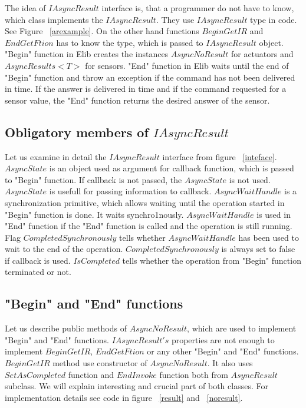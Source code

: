 	
	The idea of $IAsyncResult$ interface is, that a programmer do not have to know, which
	class implements the $IAsyncResult$. They use $IAsyncResult$ type in code. See Figure ~\ref{arexample}. 
	On the other hand functions $BeginGetIR$ and $EndGetFtion$ has to know the type, which is passed to $IAsyncResult$ object.
	"Begin" function in Elib creates the instances $AsyncNoResult$ for actuators and $AsyncResults<T>$ for sensors.
	"End" function in Elib waits until the end of "Begin" function and throw an exception if the command has not been delivered in time.
	If the answer is delivered in time and if the command requested for a sensor value, the "End" function returns the desired answer of the sensor.
	
\subsection*{Obligatory members of $IAsyncResult$} \label{sec:iasyncmemb}
	Let us examine in detail the $IAsyncResult$ interface from figure ~\ref{inteface}. 
	$AsyncState$ is an object used as argument for callback function, which
	is passed to "Begin" function. If callback is not passed, the $AsyncState$ is not used. 
	$AsyncState$ is usefull for passing information to callback.
	$AsyncWaitHandle$ is a synchronization primitive, which allows waiting until the operation 
	started in "Begin" function is done.
	It waits synchro1nously. $AsyncWaitHandle$ is used in "End" function if the "End" function is called 
	and the operation is still running. Flag $CompletedSynchronously$ tells whether  
	$AsyncWaitHandle$ has been used to wait to the end of the operation.
	$CompletedSynchronously$ is always set to false if callback is used.
	$IsCompleted$ tells whether the operation from "Begin" function terminated or not.

\subsection*{"Begin" and "End" functions} \label{sec:beginend}
	Let us describe public methods of $AsyncNoResult$, which are used to implement "Begin" and "End" functions.
	$IAsyncResult's$ properties are not enough to implement $BeginGetIR$,
	$EndGetFtion$ or any other "Begin" and "End" functions.
	$BeginGetIR$ method use constructor of $AsyncNoResult$. It also uses $SetAsCompleted$ function 
	and $EndInvoke$ function both from $AsyncResult$ subclass.
	We will explain interesting and crucial part of both classes. 
	For implementation details see code in figure ~\ref{result} and ~\ref{noresult}.

